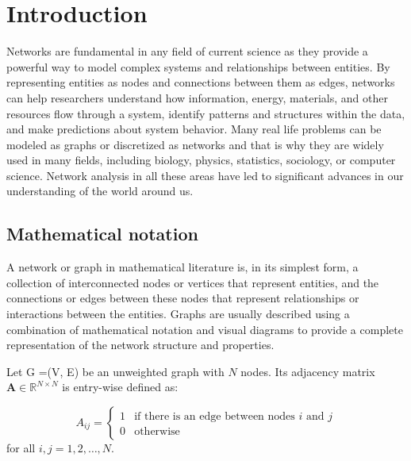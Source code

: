 
\chapter[Introduction]{Introduction}
\label{chap:intro}

Networks are fundamental in any field of current science as they provide a powerful way to model complex systems and relationships between entities. By representing entities as nodes and connections between them as edges, networks can help researchers understand how information, energy, materials, and other resources flow through a system, identify patterns and structures within the data, and make predictions about system behavior. Many real life problems can be modeled as graphs or discretized as networks and that is why they are widely used in many fields, including biology, physics, statistics, sociology, or computer science. Network analysis in all these areas have led to significant advances in our understanding of the world around us.

\section{Mathematical notation}
\label{sec:graph}
A network or graph in mathematical literature is, in its simplest form, a collection of interconnected nodes or vertices that represent entities, and the connections or edges between these nodes that represent relationships or interactions between the entities. Graphs are usually described using a combination of mathematical notation and visual diagrams to provide a complete representation of the network structure and properties. 
\begin{definition}
	Let G =(V, E) be an unweighted graph with $N$ nodes. Its adjacency matrix $\mathbf{A}\in\mathbb{R}^{N\times N}$ is entry-wise defined as:
 
 \begin{equation}
  A_{ij} =
    \begin{cases}
      1 & \text{if there is an edge between nodes $i$ and $j$}\\
      0 & \text{otherwise}
    \end{cases}       
\end{equation}
for all $i, j = 1,2,\dots, N$.
\end{definition}

